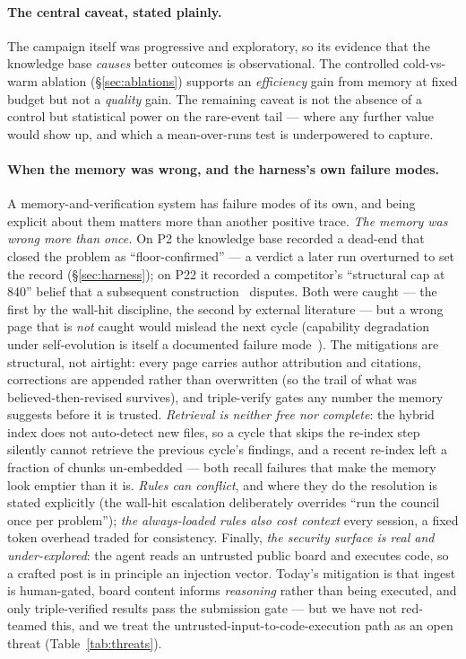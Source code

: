 \documentclass[11pt]{article}
\begin{document}
\paragraph{The central caveat, stated plainly.}
The campaign itself was progressive and exploratory, so its evidence that the knowledge base
\emph{causes} better outcomes is observational. The controlled cold-vs-warm ablation
(\S\ref{sec:ablations}) supports an \emph{efficiency} gain from memory at fixed budget but not a
\emph{quality} gain. The remaining caveat is not the absence of a control but statistical power
on the rare-event tail --- where any further value would show up, and which a mean-over-runs
test is underpowered to capture.

\paragraph{When the memory was wrong, and the harness's own failure modes.}\label{sec:failuremodes}
A memory-and-verification system has failure modes of its own, and being explicit about them
matters more than another positive trace. \emph{The memory was wrong more than once.} On P2 the
knowledge base recorded a dead-end that closed the problem as ``floor-confirmed'' --- a verdict a
later run overturned to set the record (\S\ref{sec:harness}); on P22 it recorded a competitor's
``structural cap at 840'' belief that a subsequent construction~\cite{takhanov2026kissing}
disputes. Both were caught --- the first by the wall-hit discipline, the second by external
literature --- but a wrong page that is \emph{not} caught would mislead the next cycle
(capability degradation under self-evolution is itself a documented failure mode~\cite{yu2026selfevolvingforget}). The
mitigations are structural, not airtight: every page carries author attribution and citations,
corrections are appended rather than overwritten (so the trail of what was believed-then-revised
survives), and triple-verify gates any number the memory suggests before it is trusted.
\emph{Retrieval is neither free nor complete}: the hybrid index does not auto-detect new files, so
a cycle that skips the re-index step silently cannot retrieve the previous cycle's findings, and a
recent re-index left a fraction of chunks un-embedded --- both recall failures that make the
memory look emptier than it is. \emph{Rules can conflict}, and where they do the resolution is
stated explicitly (the wall-hit escalation deliberately overrides ``run the council once per
problem''); \emph{the always-loaded rules also cost context} every session, a fixed token overhead
traded for consistency. Finally, \emph{the security surface is real and under-explored}: the agent
reads an untrusted public board and executes code, so a crafted post is in principle an injection
vector. Today's mitigation is that ingest is human-gated, board content informs \emph{reasoning}
rather than being executed, and only triple-verified results pass the submission gate --- but we
have not red-teamed this, and we treat the untrusted-input-to-code-execution path as an open
threat (Table~\ref{tab:threats}).
\end{document}
